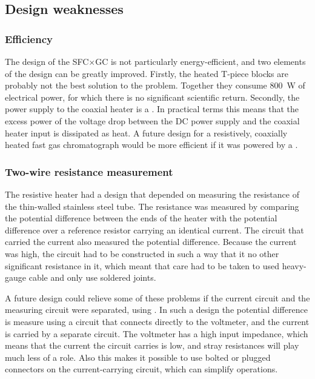 \subsection{Design weaknesses}

\subsubsection{Efficiency}

The design of the SFC×GC is not particularly energy-efficient, and two elements
of the design can be greatly improved. Firstly, the heated T-piece blocks are
probably not the best solution to the problem. Together they consume
\SI{800}{\watt} of electrical power, for which there is no significant
scientific return. Secondly, the power supply to the coaxial heater is a
. In practical terms this means that the excess
power of the voltage drop between the DC power supply and the coaxial heater
input is dissipated as heat. A future design for a resistively, coaxially heated
fast gas chromatograph would be more efficient if it was powered by a
.

\subsubsection{Two-wire resistance measurement}

The resistive heater had a design that depended on measuring the resistance of
the thin-walled stainless steel tube. The resistance was measured by comparing
the potential difference between the ends of the heater with the potential
difference over a reference resistor carrying an identical current. The circuit
that carried the current also measured the potential difference. Because the
current was high, the circuit had to be constructed in such a way that it no
other significant resistance in it, which meant that care had to be taken to  
used heavy-gauge cable and only use soldered joints. 

A future design could relieve some of these problems if the current circuit and
the measuring circuit were separated, using . In such a design the potential difference is measure using a
circuit that connects directly to the voltmeter, and the current is carried by a
separate circuit. The voltmeter has a high input impedance, which means that the
current the circuit carries is low, and stray resistances will play much less of
a role. Also this makes it possible to use bolted or plugged connectors on the
current-carrying circuit, which can simplify operations.

